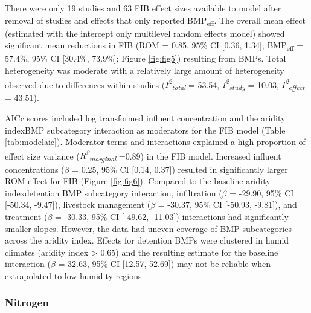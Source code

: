 \documentclass[utf8]{FrontiersinHarvard}
\begin{document}
There were only 19 studies and 63 FIB effect sizes available to model after removal of studies and effects that only reported BMP\textsubscript{eff}.
The overall mean effect (estimated with the intercept only multilevel random effects model) showed significant mean reductions in FIB (ROM = 0.85, 95\% CI {[}0.36, 1.34{]}; BMP\textsubscript{eff} = 57.4\%, 95\% CI {[}30.4\%, 73.9\%{]}; Figure \ref{fig:fig5}) resulting from BMPs.
Total heterogeneity was moderate with a relatively large amount of heterogeneity observed due to differences within studies (\textit{I\textsuperscript{2}\textsubscript{total}} = 53.54, \textit{I\textsuperscript{2}\textsubscript{study}} = 10.03, \textit{I\textsuperscript{2}\textsubscript{effect}} = 43.51).

AICc scores included log transformed influent concentration and the aridity index\texttimes BMP subcategory interaction as moderators for the FIB model (Table \ref{tab:modelaic}).
Moderator terms and interactions explained a high proportion of effect size variance (\textit{R\textsuperscript{2}\textsubscript{marginal}} =0.89) in the FIB model.
Increased influent concentrations (\(\beta\) = 0.25, 95\% CI {[}0.14, 0.37{]}) resulted in significantly larger ROM effect for FIB (Figure \ref{fig:fig6}).
Compared to the baseline aridity index\texttimes detention BMP subcategory interaction, infiltration (\(\beta\) = -29.90, 95\% CI {[}-50.34, -9.47{]}), livestock management (\(\beta\) = -30.37, 95\% CI {[}-50.93, -9.81{]}), and treatment (\(\beta\) = -30.33, 95\% CI {[}-49.62, -11.03{]}) interactions had significantly smaller slopes.
However, the data had uneven coverage of BMP subcategories across the aridity index.
Effects for detention BMPs were clustered in humid climates (aridity index \textgreater{} 0.65) and the resulting estimate for the baseline interaction (\(\beta\) = 32.63, 95\% CI {[}12.57, 52.69{]}) may not be reliable when extrapolated to low-humidity regions.

\hypertarget{nitrogen}{%
\subsubsection{Nitrogen}\label{nitrogen}}
\end{document}

